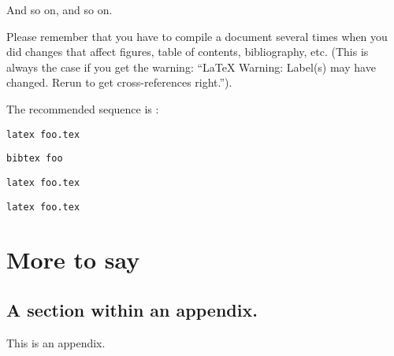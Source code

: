 \documentclass[12pt]{report}
\begin{document}
\noindent
And so on, and so on.

Please remember that you have to compile a document several times when
you did changes that affect figures, table of contents, bibliography,
etc. (This is always the case if you get the warning: ``LaTeX Warning:
Label(s) may have changed. Rerun to get cross-references right.'').

The recommended sequence is :

\texttt{latex foo.tex}

\texttt{bibtex foo}

\texttt{latex foo.tex}

\texttt{latex foo.tex}


\appendix

\chapter{More to say}

\section{A section within an appendix.}
This is an appendix.




\singlespacing

%
%
%





%

%
\end{document}
